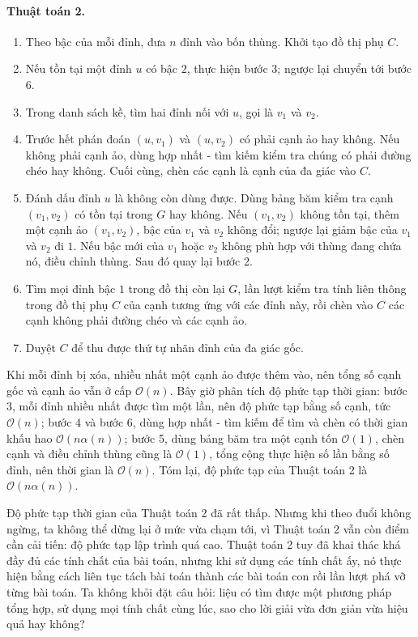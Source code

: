 \documentclass[11pt]{article}
\newcommand{\Oh}{\mathcal{O}}
\begin{document}
\paragraph{Thuật toán 2.}
\begin{enumerate}
  \item Theo bậc của mỗi đỉnh, đưa \(n\) đỉnh vào bốn thùng. Khởi tạo đồ thị
  phụ \(C\).
  \item Nếu tồn tại một đỉnh \(u\) có bậc \(2\), thực hiện bước 3; ngược lại
  chuyển tới bước 6.
  \item Trong danh sách kề, tìm hai đỉnh nối với \(u\), gọi là \(v_1\) và
  \(v_2\).
  \item Trước hết phán đoán \((u,v_1)\) và \((u,v_2)\) có phải cạnh ảo hay
  không. Nếu không phải cạnh ảo, dùng hợp nhất - tìm kiếm kiểm tra chúng có
  phải đường chéo hay không. Cuối cùng, chèn các cạnh là cạnh của đa giác vào
  \(C\).
  \item Đánh dấu đỉnh \(u\) là không còn dùng được. Dùng bảng băm kiểm tra
  cạnh \((v_1,v_2)\) có tồn tại trong \(G\) hay không. Nếu \((v_1,v_2)\) không
  tồn tại, thêm một cạnh ảo \((v_1,v_2)\), bậc của \(v_1\) và \(v_2\) không
  đổi; ngược lại giảm bậc của \(v_1\) và \(v_2\) đi \(1\). Nếu bậc mới của
  \(v_1\) hoặc \(v_2\) không phù hợp với thùng đang chứa nó, điều chỉnh thùng.
  Sau đó quay lại bước 2.
  \item Tìm mọi đỉnh bậc \(1\) trong đồ thị còn lại \(G\), lần lượt kiểm tra
  tính liên thông trong đồ thị phụ \(C\) của cạnh tương ứng với các đỉnh này,
  rồi chèn vào \(C\) các cạnh không phải đường chéo và các cạnh ảo.
  \item Duyệt \(C\) để thu được thứ tự nhãn đỉnh của đa giác gốc.
\end{enumerate}

Khi mỗi đỉnh bị xóa, nhiều nhất một cạnh ảo được thêm vào, nên tổng số cạnh
gốc và cạnh ảo vẫn ở cấp \(\Oh(n)\). Bây giờ phân tích độ phức tạp thời gian:
bước 3, mỗi đỉnh nhiều nhất được tìm một lần, nên độ phức tạp bằng số cạnh,
tức \(\Oh(n)\); bước 4 và bước 6, dùng hợp nhất - tìm kiếm để tìm và chèn có
thời gian khấu hao \(\Oh(n\alpha(n))\); bước 5, dùng bảng băm tra một cạnh tốn
\(\Oh(1)\), chèn cạnh và điều chỉnh thùng cũng là \(\Oh(1)\), tổng cộng thực
hiện số lần bằng số đỉnh, nên thời gian là \(\Oh(n)\). Tóm lại, độ phức tạp
của Thuật toán 2 là \(\Oh(n\alpha(n))\).

Độ phức tạp thời gian của Thuật toán 2 đã rất thấp. Nhưng khi theo đuổi không
ngừng, ta không thể dừng lại ở mức vừa chạm tới, vì Thuật toán 2 vẫn còn điểm
cần cải tiến: độ phức tạp lập trình quá cao. Thuật toán 2 tuy đã khai thác khá
đầy đủ các tính chất của bài toán, nhưng khi sử dụng các tính chất ấy, nó thực
hiện bằng cách liên tục tách bài toán thành các bài toán con rồi lần lượt phá
vỡ từng bài toán. Ta không khỏi đặt câu hỏi: liệu có tìm được một phương pháp
tổng hợp, sử dụng mọi tính chất cùng lúc, sao cho lời giải vừa đơn giản vừa
hiệu quả hay không?
\end{document}
